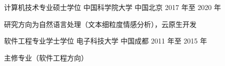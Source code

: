 

\begin{cventries}

  \cventry
    {计算机技术专业硕士学位} %
    {中国科学院大学} %
    {中国北京} %
    {2017 年至 2020 年} %
    {
      \begin{cvitems} %
        \item 研究方向为自然语言处理（文本细粒度情感分析），云原生开发
      \end{cvitems}
    }

  \cventry
    {软件工程专业学士学位} %
    {电子科技大学} %
    {中国成都} %
    {2011 年至 2015 年} %
    {
      \begin{cvitems} %
        \item 主修专业（软件工程方向）
      \end{cvitems}
    }

\end{cventries}
